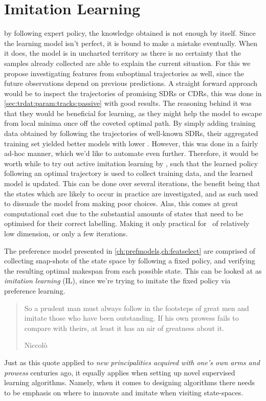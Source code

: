 \chapter{Imitation Learning}\label{ch:imitation}

 by following 
expert policy, the knowledge obtained is not enough by itself. Since the 
learning model isn't perfect, it is bound to make a mistake eventually. 
When it does, the model is in uncharted territory as there is no certainty that
the samples already collected are able to explain the current situation. 
For this we propose investigating features from suboptimal trajectories as 
well, since the future observations depend on previous predictions. 
A straight forward approach would be to inspect the trajectories of promising 
SDRs or CDRs, this was done in \cref{sec:trdat:param:tracks:passive} with good 
results. 
The reasoning behind it was that they would be beneficial for learning, 
as they might help the model to escape from local minima once off the coveted 
optimal path. 
By simply adding training data obtained by following the trajectories of 
well-known SDRs, their aggregated training set yielded better models with lower 
\namerho.
However, this was done in a fairly ad-hoc manner, which we'd like to automate 
even further.  
Therefore, it would be worth while to try out active imitation learning by 
\cite{RossB10,RossGB11}, such that the learned policy following an optimal 
trajectory is used to collect training data, and the learned model is updated. 
This can be done over several iterations, the benefit being that the 
states which are likely to occur in practice are investigated, and as such used 
to dissuade the model from making poor choices. 
Alas, this comes at great computational cost due to the substantial amounts of 
states that need to be optimised for their correct labelling. 
Making it only practical for \jsp\ of relatively low dimension, or only a few 
iterations. 

The preference model presented in \cref{ch:prefmodels,ch:featselect} are 
comprised of collecting snap-shots of the state space by following a fixed
policy, and verifying the resulting optimal makespan from each possible state. 
This can be looked at as \emph{imitation learning} (IL), since we're trying to 
imitate the fixed policy via preference learning. 

\begin{quote}
    So a prudent man must always follow in the footsteps of great men and 
    imitate those who have been outstanding. If his own prowess fails to 
    compare with theirs, at least it has an air of greatness about it. 
    
    \raggedleft Niccolò \cite{Maachiavelli}
\end{quote}
Just as this quote applied to \emph{new principalities acquired with one's own 
arms and prowess} centuries ago, it equally applies when setting up novel 
supervised learning algorithms. 
Namely, when it comes to designing algorithms there needs to be emphasis on 
where to innovate and imitate when visiting state-spaces. 

